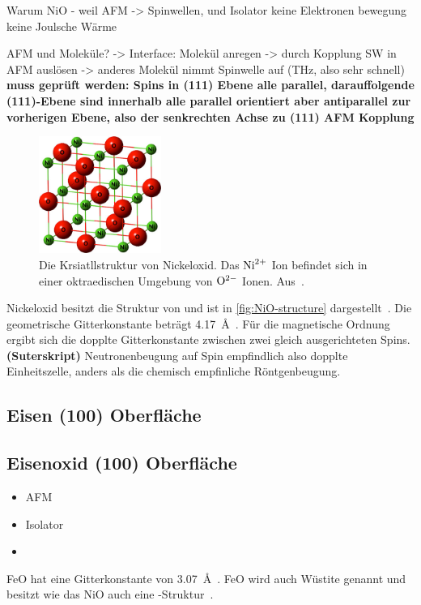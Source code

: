             Warum NiO - weil AFM -> Spinwellen, und Isolator keine Elektronen bewegung keine Joulsche Wärme

            AFM und Moleküle? -> Interface: Molekül anregen -> durch Kopplung SW in AFM auslösen -> anderes Molekül nimmt Spinwelle auf (THz, also sehr schnell)
            \textbf{muss geprüft werden: Spins in (111) Ebene alle parallel, darauffolgende (111)-Ebene sind innerhalb alle parallel orientiert aber antiparallel zur vorherigen Ebene, also der senkrechten Achse zu (111) AFM Kopplung}

            \begin{figure}
                \centering
                \includegraphics[width=4cm]{./content/NiO-structure}
                \caption{Die Krsiatllstruktur von Nickeloxid. Das $\ce{Ni}^{2+}$ Ion befindet sich in einer oktraedischen Umgebung von $\ce{O}^{2-}$ Ionen. Aus~\cite{NiO-structure}.}
                \label{fig:NiO-structure}
            \end{figure}

            Nickeloxid besitzt die Struktur von  und ist in \autoref{fig:NiO-structure} dargestellt~\cite{kunz_chemisorption_1985}. 
            Die geometrische Gitterkonstante beträgt \SI{4.17}{\angstrom}~\cite{sebbari_uranyl_2012}.
            Für die magnetische Ordnung ergibt sich die dopplte Gitterkonstante zwischen zwei gleich ausgerichteten Spins. \textbf{(Suterskript)}
            Neutronenbeugung auf Spin empfindlich also dopplte Einheitszelle, anders als die chemisch empfinliche Röntgenbeugung.
        
        \subsection{Eisen (100) Oberfläche}

        \subsection{Eisenoxid (100) Oberfläche}
            \begin{itemize}
                \item AFM
                \item Isolator
                \item 
            \end{itemize}
            FeO hat eine Gitterkonstante von \SI{3.07}{\angstrom}~\cite{FeO_1}.
            FeO wird auch Wüstite genannt und besitzt wie das NiO auch eine -Struktur~\cite{FeO_4}.

